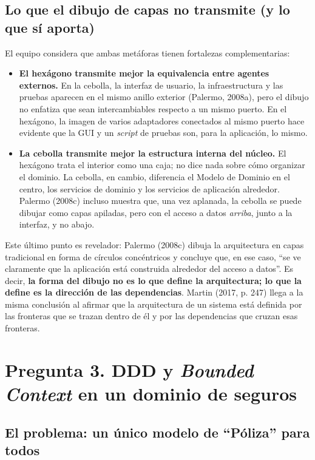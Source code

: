 \documentclass[11pt,a4paper]{article}
\begin{document}
\subsection{Lo que el dibujo de capas no transmite (y lo que sí aporta)}

El equipo considera que ambas metáforas tienen fortalezas complementarias:

\begin{itemize}[leftmargin=1.5em]
  \item \textbf{El hexágono transmite mejor la equivalencia entre agentes externos.} En la cebolla, la interfaz de usuario, la infraestructura y las pruebas aparecen en el mismo anillo exterior (Palermo, 2008a), pero el dibujo no enfatiza que sean intercambiables respecto a un mismo puerto. En el hexágono, la imagen de varios adaptadores conectados al mismo puerto hace evidente que la GUI y un \emph{script} de pruebas son, para la aplicación, lo mismo.
  \item \textbf{La cebolla transmite mejor la estructura interna del núcleo.} El hexágono trata el interior como una caja; no dice nada sobre cómo organizar el dominio. La cebolla, en cambio, diferencia el Modelo de Dominio en el centro, los servicios de dominio y los servicios de aplicación alrededor. Palermo (2008c) incluso muestra que, una vez aplanada, la cebolla se puede dibujar como capas apiladas, pero con el acceso a datos \emph{arriba}, junto a la interfaz, y no abajo.
\end{itemize}

Este último punto es revelador: Palermo (2008c) dibuja la arquitectura en capas tradicional en forma de círculos concéntricos y concluye que, en ese caso, ``se ve claramente que la aplicación está construida alrededor del acceso a datos''. Es decir, \textbf{la forma del dibujo no es lo que define la arquitectura; lo que la define es la dirección de las dependencias}. Martin (2017, p. 247) llega a la misma conclusión al afirmar que la arquitectura de un sistema está definida por las fronteras que se trazan dentro de él y por las dependencias que cruzan esas fronteras.

\section{Pregunta 3. DDD y \emph{Bounded Context} en un dominio de seguros}

\subsection{El problema: un único modelo de ``Póliza'' para todos}
\end{document}
